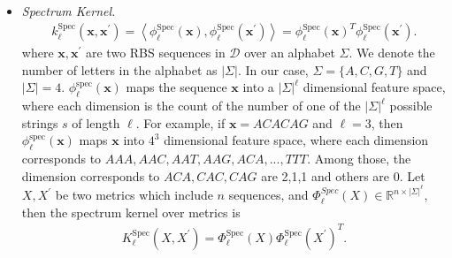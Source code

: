 \documentclass{scrartcl}[2013/05/29]%
\begin{document}
\begin{itemize}
    \item \textit{Spectrum Kernel.}
    \begin{align}
        k_\ell^{\text{Spec}}(\mathbf{x}, \mathbf{x}^\prime) =\left\langle\phi_{\ell}^{\mathrm{Spec}}(\mathbf{x}), \phi_{\ell}^{\mathrm{Spec}}\left(\mathbf{x}^{\prime}\right)\right\rangle = \phi_{\ell}^{\mathrm{Spec}}(\mathbf{x})^T \phi_{\ell}^{\mathrm{Spec}}\left(\mathbf{x}^{\prime}\right).
    \end{align}
     where $\mathbf{x}, \mathbf{x}^\prime$ are two RBS sequences in $\mathcal{D}$ over an alphabet $\Sigma$. We denote the number of letters in the alphabet as $|\Sigma|$. 
     In our case, $\Sigma = \{A,C,G,T\}$ and $|\Sigma| = 4$.
    $\phi_{\ell}^{\mathrm{spec}}(\mathbf{x})$ maps the sequence $\mathbf{x}$ into a $|\Sigma|^\ell$ dimensional feature space, where each dimension is the count of the number of one of the $|\Sigma|^\ell$ possible strings $s$ of length $\ell$. 
    For example, if $\mathbf{x} = ACACAG$ and $\ell = 3$, then $\phi_{\ell}^{\mathrm{spec}}(\mathbf{x})$ maps $\mathbf{x}$ into $4^3$ dimensional feature space, where each dimension corresponds to $AAA, AAC, AAT, AAG, ACA, ..., TTT$. Among those, the dimension corresponds to $ACA, CAC, CAG$ are 2,1,1 and others are 0. 
    Let $X, X^\prime$ be two metrics which include $n$ sequences, and $\Phi_\ell^{Spec}(X) \in \mathbb{R}^{n \times |\Sigma|^{\ell}}$, then the spectrum kernel over metrics is 
    \begin{align}
         K_\ell^{\text{Spec}}(X, X^\prime) = \Phi_{\ell}^{\mathrm{Spec}}(X) \Phi_{\ell}^{\mathrm{Spec}}\left(X^{\prime}\right)^T.
    \end{align}
    
    

\end{itemize}
\end{document}
